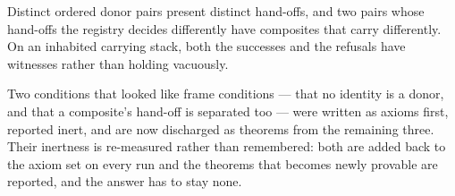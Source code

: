 Distinct ordered donor pairs present distinct hand-offs, and two pairs whose
hand-offs the registry decides differently have composites that carry
differently. On an inhabited carrying stack, both the successes and the refusals
have witnesses rather than holding vacuously.

Two conditions that looked like frame conditions --- that no identity is a donor,
and that a composite's hand-off is separated too --- were written as axioms first,
reported inert, and are now discharged as theorems from the remaining three.
Their inertness is re-measured rather than remembered: both are added back to the
axiom set on every run and the theorems that becomes newly provable are reported,
and the answer has to stay none.

